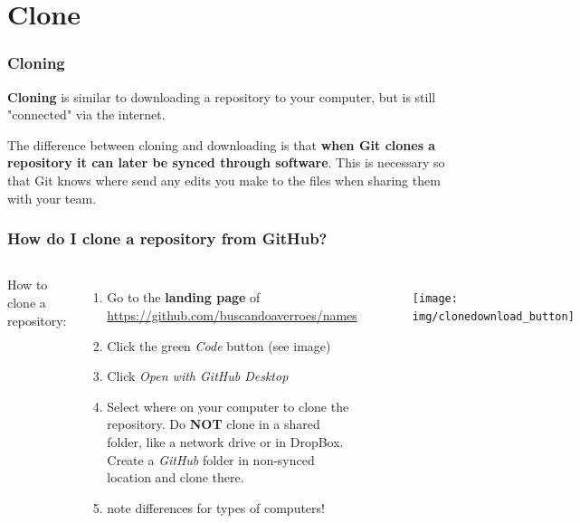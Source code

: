\documentclass[aspectratio=169]{beamer} %
\newcommand{\trainingURL}[1]{{\color{blue}\url{#1}}}
\newcommand{\traininerUsername}{buscandoaverroes}
\newcommand{\repoName}{\traininerUsername/names}
\newcommand{\trainingRepoURL}[1]{\trainingURL{https://github.com/\repoName #1}}
\begin{document}
\section{Clone}

\begin{frame}
\frametitle{Cloning}

	\textbf{Cloning} is similar to downloading a repository to your computer, but is still "connected" via the internet.

	\vspace{.5cm}

	The difference between cloning and downloading is that \textbf{when Git clones a repository it can later be synced through software}. This is necessary so that Git knows where send any edits you make to the files when sharing them with your team.

\end{frame}

\begin{frame}
\frametitle{How do I clone a repository from GitHub?}

	\begin{columns}[c]

		How to clone a repository:
		\begin{enumerate}
			\item Go to the \textbf{landing page} of \trainingRepoURL{}
			\item Click the green \textit{Code} button (see image)
			\item Click \textit{Open with GitHub Desktop}
			\item Select where on your computer to clone the repository. Do \textbf{NOT} clone in a shared folder, like a network drive or in DropBox. Create a \textit{GitHub} folder in non-synced location and clone there.
			\item note differences for types of computers!
		\end{enumerate}

		\begin{figure}
			\centering
			\texttt{[image: img/clonedownload\_button]}
			\label{fig:clonedownloadbutton}
		\end{figure}

	\end{columns}

\end{frame}
\end{document}
